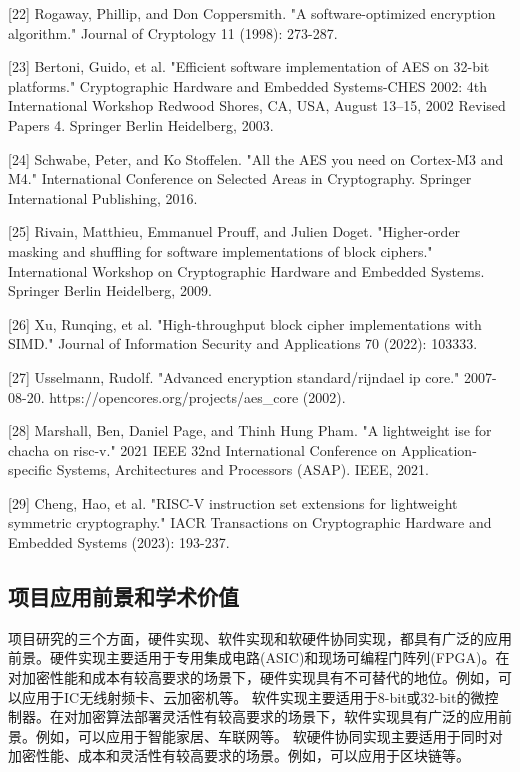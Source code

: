 \documentclass{ctexart}
\begin{document}
    [22] Rogaway, Phillip, and Don Coppersmith. "A software-optimized encryption algorithm." Journal of Cryptology 11 (1998): 273-287.

[23] Bertoni, Guido, et al. "Efficient software implementation of AES on 32-bit platforms." Cryptographic Hardware and Embedded Systems-CHES 2002: 4th International Workshop Redwood Shores, CA, USA, August 13–15, 2002 Revised Papers 4. Springer Berlin Heidelberg, 2003.

    [24] Schwabe, Peter, and Ko Stoffelen. "All the AES you need on Cortex-M3 and M4." International Conference on Selected Areas in Cryptography. Springer International Publishing, 2016.

    [25] Rivain, Matthieu, Emmanuel Prouff, and Julien Doget. "Higher-order masking and shuffling for software implementations of block ciphers." International Workshop on Cryptographic Hardware and Embedded Systems. Springer Berlin Heidelberg, 2009.

    [26] Xu, Runqing, et al. "High-throughput block cipher implementations with SIMD." Journal of Information Security and Applications 70 (2022): 103333.

    [27] Usselmann, Rudolf. "Advanced encryption standard/rijndael ip core." 2007-08-20. https://opencores.org/projects/aes\_core (2002).

[28] Marshall, Ben, Daniel Page, and Thinh Hung Pham. "A lightweight ise for chacha on risc-v." 2021 IEEE 32nd International Conference on Application-specific Systems, Architectures and Processors (ASAP). IEEE, 2021.

    [29] Cheng, Hao, et al. "RISC-V instruction set extensions for lightweight symmetric cryptography." IACR Transactions on Cryptographic Hardware and Embedded Systems (2023): 193-237.

\subsection{项目应用前景和学术价值}
项目研究的三个方面，硬件实现、软件实现和软硬件协同实现，都具有广泛的应用前景。硬件实现主要适用于专用集成电路(ASIC)和现场可编程门阵列(FPGA)。在对加密性能和成本有较高要求的场景下，硬件实现具有不可替代的地位。例如，可以应用于IC无线射频卡、云加密机等。
软件实现主要适用于8-bit或32-bit的微控制器。在对加密算法部署灵活性有较高要求的场景下，软件实现具有广泛的应用前景。例如，可以应用于智能家居、车联网等。
软硬件协同实现主要适用于同时对加密性能、成本和灵活性有较高要求的场景。例如，可以应用于区块链等。
\end{document}
